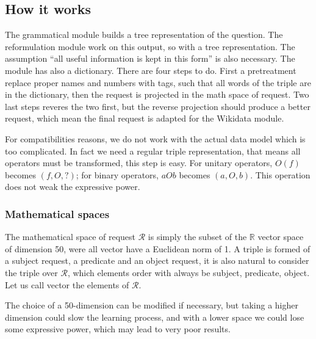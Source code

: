 \FloatBarrier
\subsection{How it works}


The grammatical module builds a tree representation of the question. The reformulation module work on this output, so with a tree representation. The assumption ``all useful information is kept in this form''  is also necessary. The module has also a dictionary. There are four steps to do. First a pretreatment replace proper names and numbers with tags, such that all words of the triple are in the dictionary, then the request is projected in the math space of request. Two last steps reveres the two first, but the reverse projection should produce a better request, which mean the final request is adapted for the Wikidata module.

For compatibilities reasons, we do not work with the actual data model which is too complicated. In fact we need a regular triple representation, that means all operators must be transformed, this step is easy. For unitary operators, $O(f)$ becomes $(f,O,?)$; for binary operators, $aOb$ becomes $(a,O,b)$. This operation does not weak the expressive power.

\subsubsection{Mathematical spaces}

The mathematical space of request $\mathcal{R}$ is simply the subset of the $\mathbb{R}$ vector space of dimension 50, were all vector have a Euclidean norm of 1.
A triple is formed of a subject request, a predicate and an object request, it is also natural to consider the triple over $\mathcal{R}$, which elements order with always be subject, predicate, object.
Let us call vector the elements of $\mathcal{R}$.

The choice of a 50-dimension can be modified if necessary, but taking a higher dimension could slow the learning process, and with a lower space we could lose some expressive power, which may lead to very poor results.



